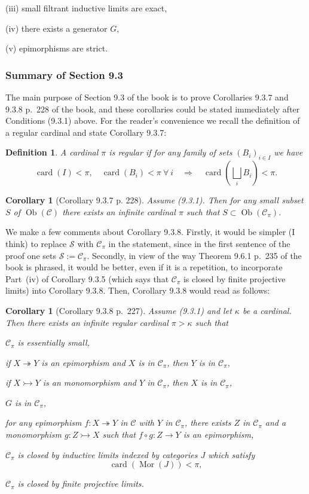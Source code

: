 \documentclass[12pt]{article}%
\newtheorem{cor}[thm]{Corollary}
\newtheorem{df}[thm]{Definition}%
\theoremstyle{remark}
\theoremstyle{definition}
\newcommand{\nn}{\noindent}
\newcommand{\cc}{\mathcal}
\newcommand{\C}{\mathcal C}
\newcommand{\epi}{\twoheadrightarrow}
\newcommand{\mono}{\rightarrowtail}%
\newcommand{\then}{\Rightarrow}
\DeclareMathOperator{\card}{card}%
\DeclareMathOperator{\Mor}{Mor}
\DeclareMathOperator{\Ob}{Ob}
\begin{document}
(iii) small filtrant inductive limits are exact, 

(iv) there exists a generator $G$,

(v) epimorphisms are strict.

\subsubsection{Summary of Section 9.3}

The main purpose of Section 9.3 of the book is to prove Corollaries 9.3.7 and 9.3.8 p.~228 of the book, and these corollaries could be stated immediately after Conditions (9.3.1) above. For the reader's convenience we recall the definition of a regular cardinal and state Corollary 9.3.7:

\begin{df}\label{rc}
A cardinal $\pi$ is \emph{regular} if for any family of sets $(B_i)_{i\in I}$ we have 
$$
\card(I)<\pi,\quad\card(B_i)<\pi\ \forall\ i\quad\then\quad\card\left(\bigsqcup_iB_i\right)<\pi.
$$
\end{df}

\begin{cor}[Corollary 9.3.7 p. 228]
Assume (9.3.1). Then for any small subset $S$ of $\Ob(\C)$ there exists an infinite cardinal $\pi$ such that $S\subset\Ob(\C_\pi)$.
\end{cor}

We make a few comments about Corollary 9.3.8. Firstly, it would be simpler (I think) to replace $\cc S$ with $\C_\pi$ in the statement, since in the first sentence of the proof one sets $\cc S:=\C_\pi$. Secondly, in view of the way Theorem 9.6.1 p.~235 of the book is phrased, it would be better, even if it is a repetition, to incorporate Part~(iv) of Corollary 9.3.5 (which says that $\C_\pi$ is closed by finite projective limits) into Corollary 9.3.8. Then, Corollary 9.3.8 would read as follows:

\begin{cor}[Corollary 9.3.8 p.~227]\label{938}
Assume (9.3.1) and let $\kappa$ be a cardinal. Then there exists an infinite regular cardinal $\pi>\kappa$ such that 

\nn{\em(i)} $\C_\pi$ is essentially small,

\nn{\em(ii)} if $X\epi Y$ is an epimorphism and $X$ is in $\C_\pi$, then $Y$ is in $\C_\pi$,

\nn{\em(iii)} if $X\mono Y$ is an monomorphism and $Y$ in $\C_\pi$, then $X$ is in $\C_\pi$,

\nn{\em(iv)} $G$ is in $\C_\pi$,

\nn{\em(v)} for any epimorphism $f:X\epi Y$ in $\C$ with $Y$ in $\C_\pi$, there exists $Z$ in $\C_\pi$ and a monomorphism $g:Z\mono X$ such that $f\circ g:Z\to Y$ is an epimorphism,

\nn{\em(vi)} $\C_\pi$ is closed by inductive limits indexed by categories $J$ which satisfy $$\card(\Mor(J))<\pi,$$

\nn{\em(vii)} $\C_\pi$ is closed by finite projective limits.
\end{cor}
\end{document}
